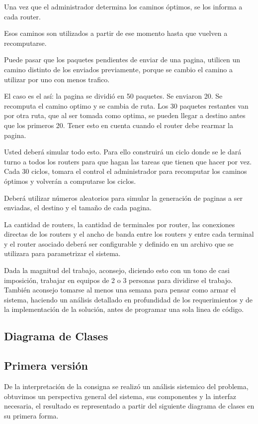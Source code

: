 \documentclass[12pt]{article} %
\begin{document}
Una vez que el administrador determina los caminos óptimos, se los informa a cada router.

Esos caminos son utilizados a partir de ese momento hasta que vuelven a recomputarse.

Puede pasar que los paquetes pendientes de enviar de una pagina, utilicen un camino distinto de los enviados previamente, porque se cambio el camino a utilizar por uno con menos trafico.

El caso es el así: la pagina se dividió en 50 paquetes. Se enviaron 20. Se recomputa el camino optimo y se cambia de ruta. Los 30 paquetes restantes van por otra ruta, que al ser tomada como optima, se pueden llegar a destino antes que los primeros 20. Tener esto en cuenta cuando el router debe rearmar la pagina.

Usted deberá simular todo esto. Para ello construirá un ciclo donde se le dará turno a todos los routers para que hagan las tareas que tienen que hacer por vez. Cada 30 ciclos, tomara el control el administrador para recomputar los caminos óptimos y volverán a computarse los ciclos.

Deberá utilizar números aleatorios para simular la generación de paginas a ser enviadas, el destino y el tamaño de cada pagina.

La cantidad de routers, la cantidad de terminales por router, las conexiones directas de los routers y el ancho de banda entre los routers y entre cada terminal y el router asociado deberá ser configurable y definido en un archivo que se utilizara para parametrizar el sistema.

Dada la magnitud del trabajo, aconsejo, diciendo esto con un tono de casi imposición, trabajar en equipos de 2 o 3 personas para dividirse el trabajo. También aconsejo tomarse al menos una semana para pensar como armar el sistema, haciendo un análisis detallado en profundidad de los requerimientos y de la implementación de la solución, antes de programar una sola linea de código.
\subsection{Diagrama de Clases}

\subsection{Primera versión}
De la interpretación de la consigna se realizó un análisis sistemico del problema, obtuvimos un perspectiva general del sistema, sus componentes y la interfaz necesaria, el resultado es representado a partir del siguiente diagrama de clases en su primera forma.
\end{document}
